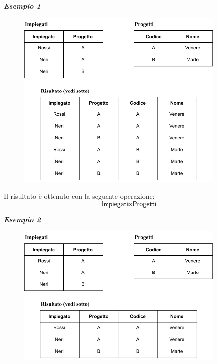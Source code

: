 \documentclass[a4paper]{article}
\begin{document}
	\noindent
	\textcolor{Green4}{\textbf{\emph{Esempio 1}}}
	
	\begin{figure}[!htp]
		\centering
		\includegraphics[width=0.9\textwidth]{img/join_theta.pdf}
	\end{figure}

	\noindent
	Il risultato è ottenuto con la seguente operazione:
	\begin{equation*}
		\textsf{Impiegati} \Join \textsf{Progetti}
	\end{equation*}\newpage

	\noindent
	\textcolor{Green4}{\textbf{\emph{Esempio 2}}}
	
	\begin{figure}[!htp]
		\centering
		\includegraphics[width=0.9\textwidth]{img/join_theta2.pdf}
	\end{figure}
	
\end{document}

